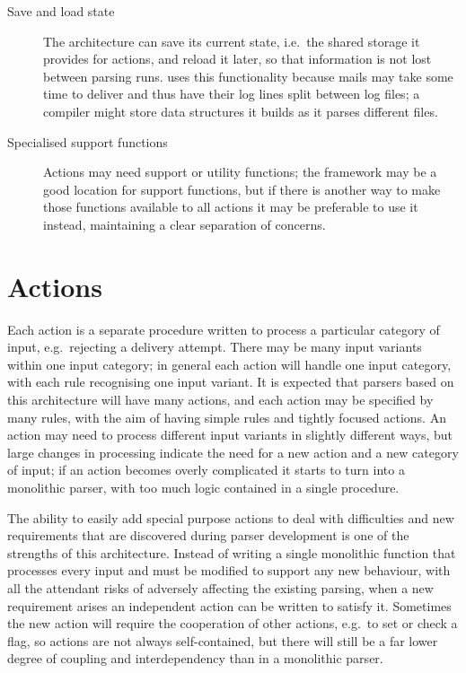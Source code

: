 \begin{description}
    \item [Save and load state]  The architecture can save its current
        state, i.e.\ the shared storage it provides for actions, and reload
        it later, so that information is not lost between parsing runs.
        \parsername{} uses this functionality because mails may take some
        time to deliver and thus have their log lines split between log
        files; a compiler might store data structures it builds as it
        parses different files.

    \item [Specialised support functions]  Actions may need support or
        utility functions; the framework may be a good location for support
        functions, but if there is another way to make those functions
        available to all actions it may be preferable to use it instead,
        maintaining a clear separation of concerns.

\end{description}

\section{Actions}

\label{actions in architecture}

Each action is a separate procedure written to process a particular
category of input, e.g.\ rejecting a delivery attempt.  There may be many
input variants within one input category; in general each action will
handle one input category, with each rule recognising one input variant.
It is expected that parsers based on this architecture will have many
actions, and each action may be specified by many rules, with the aim of
having simple rules and tightly focused actions.  An action may need to
process different input variants in slightly different ways, but large
changes in processing indicate the need for a new action and a new category
of input; if an action becomes overly complicated it starts to turn into a
monolithic parser, with too much logic contained in a single procedure.

The ability to easily add special purpose actions to deal with difficulties
and new requirements that are discovered during parser development is one
of the strengths of this architecture.  Instead of writing a single
monolithic function that processes every input and must be modified to
support any new behaviour, with all the attendant risks of adversely
affecting the existing parsing, when a new requirement arises an
independent action can be written to satisfy it.  Sometimes the new action
will require the cooperation of other actions, e.g.\ to set or check a
flag, so actions are not always self-contained, but there will still be a
far lower degree of coupling and interdependency than in a monolithic
parser.

